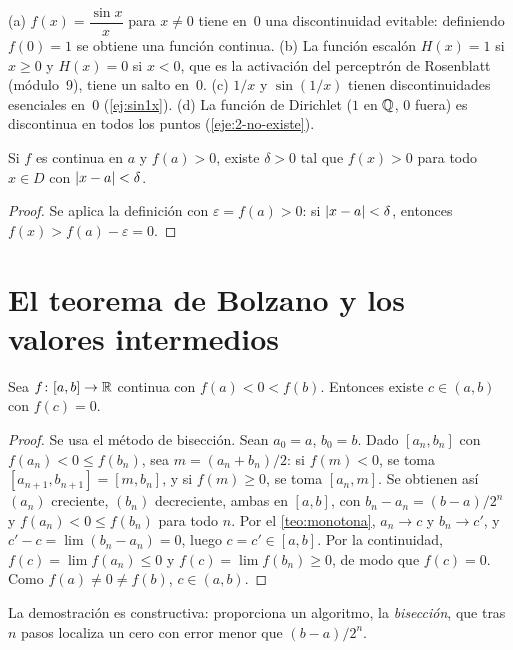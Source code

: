 \begin{ejemplo}[Discontinuidades]\label{ej:discontinuidades}
(a) $f(x)=\dfrac{\sin x}{x}$ para $x\ne0$ tiene en~0 una discontinuidad evitable: definiendo $f(0)=1$ se obtiene una función continua. (b) La función escalón $H(x)=1$ si $x\ge0$ y $H(x)=0$ si $x<0$, que es la activación del perceptrón de Rosenblatt (módulo~9), tiene un salto en~0. (c) $1/x$ y $\sin(1/x)$ tienen discontinuidades esenciales en~0 (\cref{ej:sin1x}). (d) La función de Dirichlet ($1$ en $\mathbb{Q}$, $0$ fuera) es discontinua en todos los puntos (\cref{eje:2-no-existe}).
\end{ejemplo}

\begin{proposicion}\label{prop:signo}
Si $f$ es continua en $a$ y $f(a)>0$, existe $\delta>0$ tal que $f(x)>0$ para todo $x\in D$ con $\lvert x-a\rvert<\delta$.
\end{proposicion}

\begin{proof}
Se aplica la definición con $\varepsilon=f(a)>0$: si $\lvert x-a\rvert<\delta$, entonces $f(x)>f(a)-\varepsilon=0$.
\end{proof}

\section{El teorema de Bolzano y los valores intermedios}

\begin{teorema}[Bolzano]\label{teo:bolzano}
Sea $f\colon[a,b]\to\mathbb{R}$ continua con $f(a)<0<f(b)$. Entonces existe $c\in(a,b)$ con $f(c)=0$.
\end{teorema}

\begin{proof}
Se usa el método de bisección. Sean $a_0=a$, $b_0=b$. Dado $[a_n,b_n]$ con $f(a_n)<0\le f(b_n)$, sea $m=(a_n+b_n)/2$: si $f(m)<0$, se toma $[a_{n+1},b_{n+1}]=[m,b_n]$, y si $f(m)\ge0$, se toma $[a_n,m]$. Se obtienen así $(a_n)$ creciente, $(b_n)$ decreciente, ambas en $[a,b]$, con $b_n-a_n=(b-a)/2^{n}$ y $f(a_n)<0\le f(b_n)$ para todo $n$. Por el \cref{teo:monotona}, $a_n\to c$ y $b_n\to c'$, y $c'-c=\lim(b_n-a_n)=0$, luego $c=c'\in[a,b]$. Por la continuidad, $f(c)=\lim f(a_n)\le0$ y $f(c)=\lim f(b_n)\ge0$, de modo que $f(c)=0$. Como $f(a)\ne0\ne f(b)$, $c\in(a,b)$.
\end{proof}

La demostración es constructiva: proporciona un algoritmo, la \emph{bisección}, que tras $n$ pasos localiza un cero con error menor que $(b-a)/2^{n}$.

